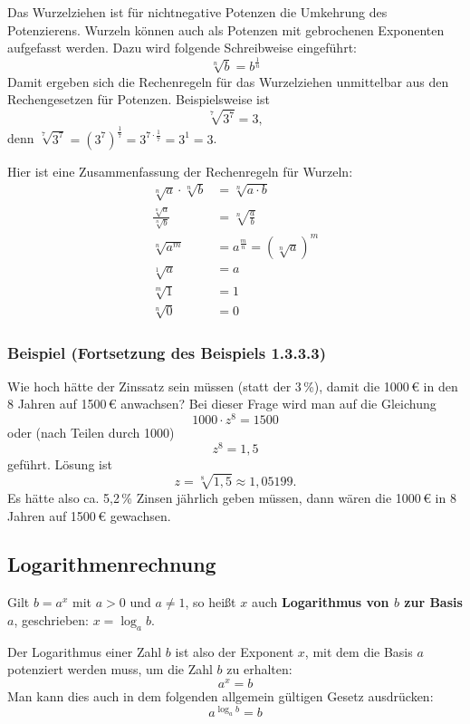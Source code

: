 Das Wurzelziehen ist für nichtnegative Potenzen die Umkehrung des Potenzierens. Wurzeln können auch als Potenzen mit gebrochenen Exponenten aufgefasst werden. Dazu wird folgende Schreibweise eingeführt:
\[ \sqrt[n]{b} = b^{\frac{1}{n}} \]
Damit ergeben sich die Rechenregeln für das Wurzelziehen unmittelbar aus den Rechengesetzen für Potenzen. Beispielsweise ist
\[ \sqrt[7]{3^7} = 3 , \]
denn $\sqrt[7]{3^7} = \left(3^7\right)^{\frac{1}{7}} = 3^{7 \cdot \frac{1}{7}} = 3^1 = 3$.

Hier ist eine Zusammenfassung der Rechenregeln für Wurzeln:
\begin{align*}
  \sqrt[n]{a} \cdot \sqrt[n]{b} &= \sqrt[n]{a \cdot b}\\
  \frac{\sqrt[n]{a}}{\sqrt[n]{b}} &= \sqrt[n]{\frac{a}{b}}\\
  \sqrt[n]{a^m} &= a^{\frac{m}{n}} = \left(\sqrt[n]{a}\right)^m\\
  \sqrt[1]{a} &= a\\
  \sqrt[m]{1} &= 1\\
  \sqrt[n]{0} &= 0
\end{align*}

\subsubsection{Beispiel (Fortsetzung des Beispiels 1.3.3.3)}

Wie hoch hätte der Zinssatz sein müssen (statt der 3\,\%), damit die 1000\,€ in den 8 Jahren auf 1500\,€ anwachsen? Bei dieser Frage wird man auf die Gleichung
\[ 1000 \cdot z^8 = 1500 \]
oder (nach Teilen durch 1000)
\[ z^8 = 1{,}5 \]
geführt. Lösung ist
\[ z = \sqrt[8]{1{,}5} \approx 1{,}05199 . \]
Es hätte also ca. 5{,}2\,\% Zinsen jährlich geben müssen, dann wären die 1000\,€ in 8 Jahren auf 1500\,€ gewachsen.\beispielende

\subsection{Logarithmenrechnung}

Gilt $b = a^x$ mit $a > 0$ und $a \neq 1$, so heißt $x$ auch \textbf{Logarithmus von $b$ zur Basis $a$}, geschrieben: $x = \log_a b$.

Der Logarithmus einer Zahl $b$ ist also der Exponent $x$, mit dem die Basis $a$ potenziert werden muss, um die Zahl $b$ zu erhalten:
\[ a^x = b \]
Man kann dies auch in dem folgenden allgemein gültigen Gesetz ausdrücken:
\[ a^{\log_a b} = b \]

